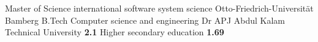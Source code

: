 %
%
%


\begin{scholarship}
					{Master of Science international software system science Otto-Friedrich-Universität Bamberg}
					{B.Tech Computer science and engineering Dr APJ Abdul Kalam Technical University  \textbf{2.1}}
					{Higher secondary education  \textbf{1.69}}
\end{scholarship}